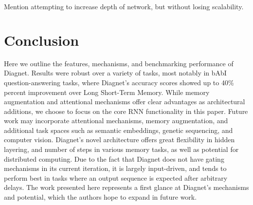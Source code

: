 \documentclass{article}
\begin{document}
Mention attempting to increase depth of network, but without losing scalability.

\section{Conclusion}
Here we outline the features, mechanisms, and benchmarking performance of Diagnet. Results were robust over a variety of tasks, most notably in bAbI question-answering tasks, where Diagnet’s accuracy scores showed up to 40\% percent improvement over Long Short-Term Memory.  While memory augmentation and attentional mechanisms offer clear advantages as architectural additions, we choose to focus on the core RNN functionality in this paper.  Future work may incorporate attentional mechanisms, memory augmentation, and additional task spaces such as semantic embeddings, genetic sequencing, and computer vision.  Diagnet’s novel architecture offers great flexibility in hidden layering, and number of steps in various memory tasks, as well as potential for distributed computing.  Due to the fact that Diagnet does not have gating mechanisms in its current iteration, it is largely input-driven, and tends to perform best in tasks where an output sequence is expected after arbitrary delays. The work presented here represents a first glance at Diagnet’s mechanisms and potential, which the authors hope to expand in future work. 
\end{document}
